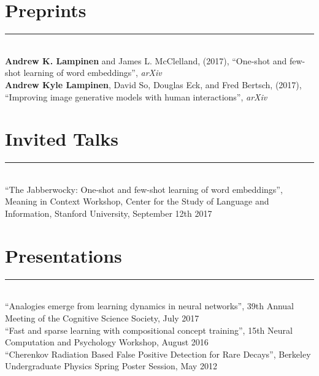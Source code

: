 \documentclass[margin]{res}
\begin{document}
\begin{resume}
\vspace{1pt}\section{Preprints} \vspace{-15pt} \rule{\textwidth}{0.5pt} \\[3pt]
\textbf{Andrew K. Lampinen} and James L. McClelland, (2017), {``One-shot and few-shot learning of word embeddings''}, \textit{arXiv} \\ [3pt] 
\textbf{Andrew Kyle Lampinen}, David So, Douglas Eck, and Fred Bertsch, (2017), {``Improving image generative models with human interactions''}, \textit{arXiv} 
\vspace{1pt}\section{Invited Talks} \vspace{-15pt} \rule{\textwidth}{0.5pt} \\[3pt]
{``The Jabberwocky: One-shot and few-shot learning of word embeddings''}, Meaning in Context Workshop, Center for the Study of Language and Information,  Stanford University, September 12th 2017 
 
\vspace{1pt}\section{Presentations} \vspace{-15pt} \rule{\textwidth}{0.5pt} \\[3pt]
{``Analogies emerge from learning dynamics in neural networks''}, 39th Annual Meeting of the Cognitive Science Society, July 2017\\[3pt]
{``Fast and sparse learning with compositional concept training''}, 15th Neural Computation and Psychology Workshop, August 2016\\[3pt]
{``Cherenkov Radiation Based False Positive Detection for Rare Decays''}, Berkeley Undergraduate Physics Spring Poster Session, May 2012


\end{resume}
\end{document}
